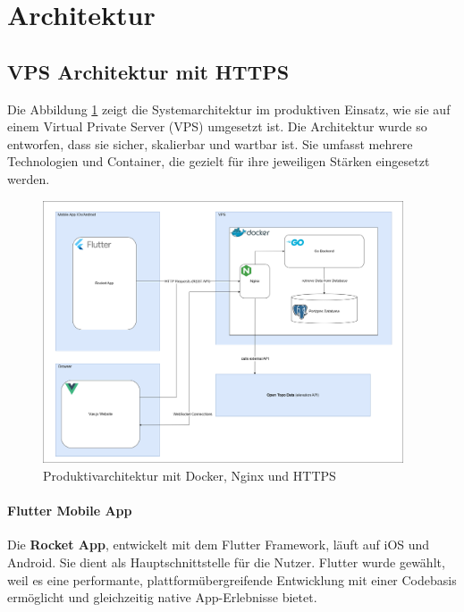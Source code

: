 \documentclass[11pt,a4paper]{article}
\begin{document}
\section{Architektur}

\subsection{VPS Architektur mit HTTPS}

Die Abbildung \ref{fig:https-architektur} zeigt die Systemarchitektur im produktiven Einsatz, wie sie auf einem Virtual Private Server (VPS) umgesetzt ist. Die Architektur wurde so entworfen, dass sie sicher, skalierbar und wartbar ist. Sie umfasst mehrere Technologien und Container, die gezielt für ihre jeweiligen Stärken eingesetzt werden\cite{docker}\cite{nginx}\cite{postgresql}.

\begin{figure}[H]
    \centering
    \includegraphics[width=0.95\textwidth]{images/HttpsArchitektur.png}
    \caption{Produktivarchitektur mit Docker, Nginx und HTTPS}
    \label{fig:https-architektur}
\end{figure}

\paragraph{Flutter Mobile App}
Die \textbf{Rocket App}, entwickelt mit dem Flutter Framework\cite{flutter}, läuft auf iOS und Android. Sie dient als Hauptschnittstelle für die Nutzer. Flutter wurde gewählt, weil es eine performante, plattformübergreifende Entwicklung mit einer Codebasis ermöglicht und gleichzeitig native App-Erlebnisse bietet.
\end{document}
